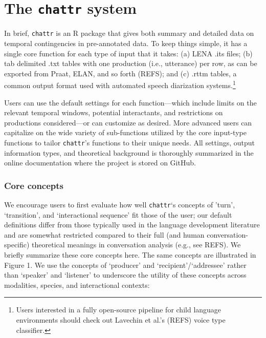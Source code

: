 \documentclass[10pt, letterpaper]{article}
\begin{document}
\hypertarget{the-chattr-system}{%
\section{\texorpdfstring{The \texttt{chattr}
system}{The chattr system}}\label{the-chattr-system}}

In brief, \texttt{chattr} is an R package that gives both summary and
detailed data on temporal contingencies in pre-annotated data. To keep
things simple, it has a single core function for each type of input that
it takes: (a) LENA .its files; (b) tab delimited .txt tables with one
production (i.e., utterance) per row, as can be exported from Praat,
ELAN, and so forth (REFS); and (c) .rttm tables, a common output format
used with automated speech diarization systems.\footnote{Users
  interested in a fully open-source pipeline for child language
  environments should check out Lavechin et al.'s (REFS) voice type
  classifier.}

Users can use the default settings for each function---which include
limits on the relevant temporal windows, potential interactants, and
restrictions on productions considered---or can customize as desired.
More advanced users can capitalize on the wide variety of sub-functions
utilized by the core input-type functions to tailor \texttt{chattr}'s
functions to their unique needs. All settings, output information types,
and theoretical background is thoroughly summarized in the online
documentation where the project is stored on GitHub.

\hypertarget{core-concepts}{%
\subsubsection{Core concepts}\label{core-concepts}}

We encourage users to first evaluate how well \texttt{chattr}`s concepts
of 'turn', `transition', and `interactional sequence' fit those of the
user; our default definitions differ from those typically used in the
language development literature and are somewhat restricted compared to
their full (and human conversation-specific) theoretical meanings in
conversation analysis (e.g., see REFS). We briefly summarize these core
concepts here. The same concepts are illustrated in Figure 1. We use the
concepts of `producer' and `recipient'/`addressee' rather than `speaker'
and `listener' to underscore the utility of these concepts across
modalities, species, and interactional contexts:
\end{document}
